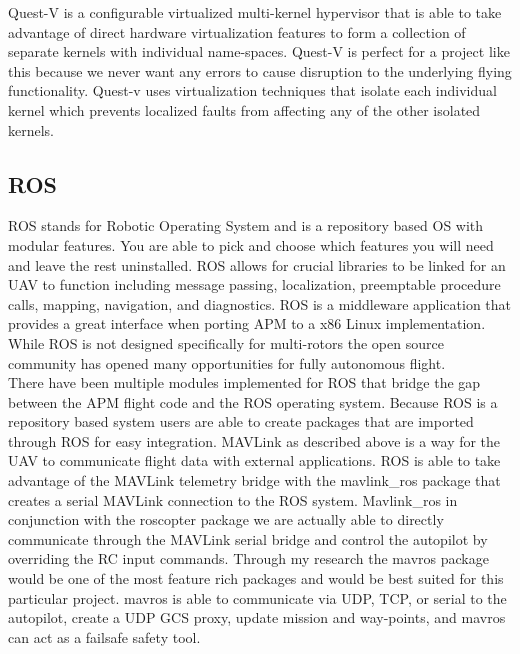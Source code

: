 \documentclass[letterpaper,10pt,notitlepage,fleqn]{article}
\begin{document}
Quest-V is a configurable virtualized multi-kernel hypervisor that is able to take advantage of direct hardware virtualization features to form a collection of separate kernels with individual name-spaces. Quest-V is perfect for a project like this because we never want any errors to cause disruption to the underlying flying functionality. Quest-v uses virtualization techniques that isolate each individual kernel which prevents localized faults from affecting any of the other isolated
kernels. 

\subsection{ROS}
\indent ROS stands for Robotic Operating System and is a repository based OS with modular features. You are able to pick and choose which features you will need and leave the rest uninstalled. ROS allows for crucial libraries to be linked for an UAV to function including message passing, localization, preemptable procedure calls, mapping, navigation, and diagnostics. ROS is a middleware application that provides a great interface when porting APM to a x86 Linux implementation. While ROS is
not designed specifically for multi-rotors the open source community has opened many opportunities for fully autonomous flight. 
\\
\indent There have been multiple modules implemented for ROS that bridge the gap between the APM flight code and the ROS operating system. Because ROS is a repository based system users are able to create packages that are imported through ROS for easy integration. MAVLink as described above is a way for the UAV to communicate flight data with external applications. ROS is able to take advantage of the MAVLink telemetry bridge with the mavlink\_ros package that creates
a serial MAVLink connection to the ROS system. Mavlink\_ros in conjunction with the roscopter package we are actually able to directly communicate through the MAVLink serial bridge and control the autopilot by overriding the RC input commands. Through my research the mavros package  would be one of the most feature rich packages and would be best suited for this particular project. mavros is able to communicate via UDP, TCP, or serial to the autopilot, create a UDP GCS
proxy, update mission and way-points, and mavros can act as a failsafe safety tool. 
\end{document}
